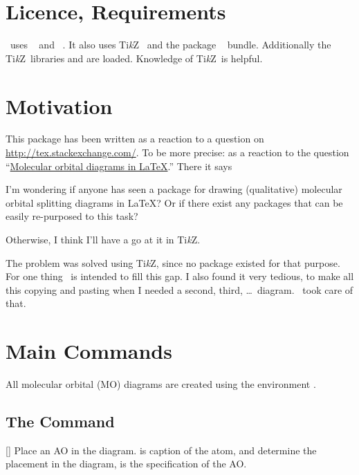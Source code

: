 \documentclass[load-preamble+]{cnltx-doc}
\newcommand*\TikZ{Ti\textit{k}Z}
\begin{document}
\section{Licence, Requirements}
\license

\modiag\ uses ~\cite{bnd:l3kernel} and
~\cite{bnd:l3packages}. It also uses \TikZ~\cite{pkg:pgf} and
the package ~\cite{pkg:chemgreek} bundle.  Additionally the
\TikZ\ libraries  and  are loaded.  Knowledge of
\TikZ\ is helpful.

\section{Motivation}
This package has been written as a reaction to a question on
\url{http://tex.stackexchange.com/}. To be more precise: as a reaction to the
question
``\href{http://tex.stackexchange.com/questions/13863/molecular-orbital-diagrams-in-latex}%
{Molecular orbital diagrams in LaTeX}.'' There it says
\begin{cnltxquote}
  I'm wondering if anyone has seen a package for drawing (qualitative)
  molecular orbital splitting diagrams in \LaTeX? Or if there exist any
  packages that can be easily re-purposed to this task?

  Otherwise, I think I'll have a go at it in \TikZ.
\end{cnltxquote}
The problem was solved using \TikZ, since no package existed for that purpose.
For one thing \modiag\ is intended to fill this gap. I also found it very
tedious, to make all this copying and pasting when I needed a second, third,
\ldots\ diagram. \modiag\ took care of that.


\section{Main Commands}
All molecular orbital (MO) diagrams are created using the environment
.

\subsection{The  Command}
\begin{commands}
  []
    Place an \acs{AO} in the diagram.  is caption of the atom,
     and  determine the placement in the diagram,
     is the specification of the \ac{AO}.
\end{commands}
\end{document}
